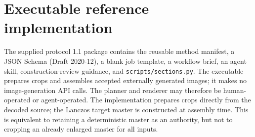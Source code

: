 \documentclass[10pt,twocolumn]{article}
\begin{document}
\section{Executable reference implementation}
The supplied protocol 1.1 package contains the reusable method manifest, a JSON Schema (Draft 2020-12), a blank job template, a workflow brief, an agent skill, construction-review guidance, and \texttt{scripts/sections.py}. The executable prepares crops and assembles accepted externally generated images; it makes no image-generation API calls. The planner and renderer may therefore be human-operated or agent-operated. The implementation prepares crops directly from the decoded source; the Lanczos target master is constructed at assembly time. This is equivalent to retaining a deterministic master as an authority, but not to cropping an already enlarged master for all inputs.
\end{document}
